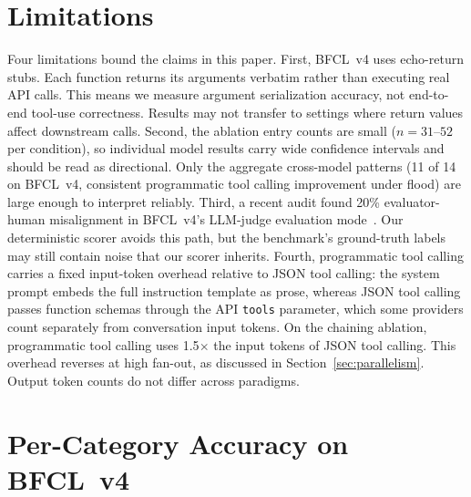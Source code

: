 \documentclass[11pt]{article}
\newcommand{\bfcl}{BFCL~v4}
\newcommand{\codemode}{programmatic tool calling}
\newcommand{\jsonmode}{JSON tool calling}
\begin{document}
\section{Limitations}

Four limitations bound the claims in this paper.
First, \bfcl{} uses echo-return stubs. Each function returns its arguments
verbatim rather than executing real API calls.
This means we measure argument serialization accuracy, not end-to-end
tool-use correctness. Results may not transfer to settings where return
values affect downstream calls.
Second, the ablation entry counts are small ($n = 31$--$52$ per condition),
so individual model results carry wide confidence intervals and should be
read as directional.
Only the aggregate cross-model patterns (11 of 14 on \bfcl{}, consistent
\codemode{} improvement under flood) are large enough to interpret reliably.
Third, a recent audit found 20\% evaluator-human misalignment in \bfcl{}'s
LLM-judge evaluation mode~\citep{bfclaudit2026}. Our deterministic scorer
avoids this path, but the benchmark's ground-truth labels may still contain
noise that our scorer inherits.
Fourth, \codemode{} carries a fixed input-token overhead relative to \jsonmode{}:
the system prompt embeds the full instruction template as prose, whereas
\jsonmode{} passes function schemas through the API \texttt{tools} parameter,
which some providers count separately from conversation input tokens.
On the chaining ablation, \codemode{} uses 1.5$\times$ the input tokens of
\jsonmode{}. This overhead reverses at high fan-out, as discussed in
Section~\ref{sec:parallelism}. Output token counts do not differ across
paradigms.



\appendix

\section{Per-Category Accuracy on \bfcl{}}
\label{app:per_category}
\end{document}
